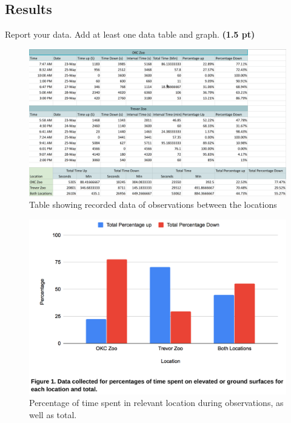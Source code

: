 \documentclass[12pt,a4paper]{article}
\begin{document}
\subsection*{Results}
\begin{enumerate}[font=\bfseries, wide, resume]
    {\color{under}\item Report your data. Add at least one data table and graph. \textbf{(1.5 pt)}}
    \begin{figure}[h]
        \centering
        \caption{Table showing recorded data of observations between the locations}
        \includegraphics[scale=0.29]{images/tab-9.png}
    \end{figure}
    \begin{figure}[h]
        \centering
        \includegraphics[scale=0.38]{images/fig-9-1.png}
        \caption{Percentage of time spent in relevant location during observations, as well as total.}
    \end{figure}
    \begin{figure}[ht]

\end{figure}
\end{enumerate}
\end{document}
